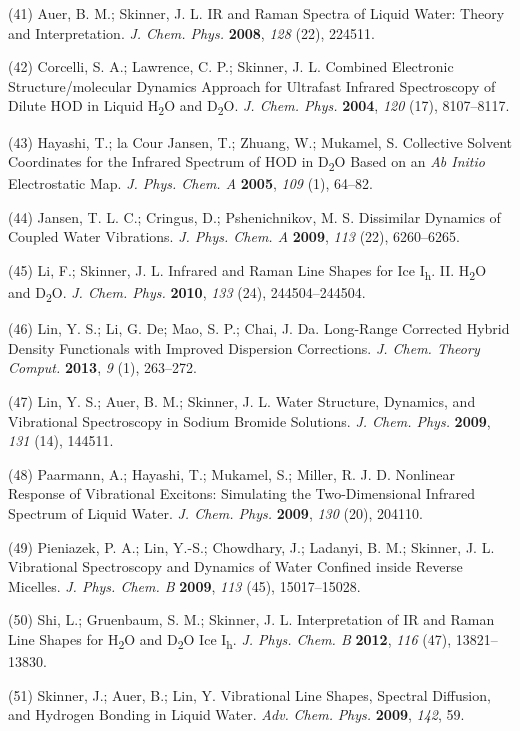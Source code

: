 \documentclass[]{article}
\begin{document}
(41) Auer, B. M.; Skinner, J. L. IR and Raman Spectra of Liquid Water:
Theory and Interpretation. \emph{J. Chem. Phys.} \textbf{2008},
\emph{128} (22), 224511.

(42) Corcelli, S. A.; Lawrence, C. P.; Skinner, J. L. Combined
Electronic Structure/molecular Dynamics Approach for Ultrafast Infrared
Spectroscopy of Dilute HOD in Liquid H\textsubscript{2}O and
D\textsubscript{2}O. \emph{J. Chem. Phys.} \textbf{2004}, \emph{120}
(17), 8107--8117.

(43) Hayashi, T.; la Cour Jansen, T.; Zhuang, W.; Mukamel, S. Collective
Solvent Coordinates for the Infrared Spectrum of HOD in
D\textsubscript{2}O Based on an \emph{Ab Initio} Electrostatic Map.
\emph{J. Phys. Chem. A} \textbf{2005}, \emph{109} (1), 64--82.

(44) Jansen, T. L. C.; Cringus, D.; Pshenichnikov, M. S. Dissimilar
Dynamics of Coupled Water Vibrations. \emph{J. Phys. Chem. A}
\textbf{2009}, \emph{113} (22), 6260--6265.

(45) Li, F.; Skinner, J. L. Infrared and Raman Line Shapes for Ice
I\textsubscript{h}. II. H\textsubscript{2}O and D\textsubscript{2}O.
\emph{J. Chem. Phys.} \textbf{2010}, \emph{133} (24), 244504--244504.

(46) Lin, Y. S.; Li, G. De; Mao, S. P.; Chai, J. Da. Long-Range
Corrected Hybrid Density Functionals with Improved Dispersion
Corrections. \emph{J. Chem. Theory Comput.} \textbf{2013}, \emph{9} (1),
263--272.

(47) Lin, Y. S.; Auer, B. M.; Skinner, J. L. Water Structure, Dynamics,
and Vibrational Spectroscopy in Sodium Bromide Solutions. \emph{J. Chem.
Phys.} \textbf{2009}, \emph{131} (14), 144511.

(48) Paarmann, A.; Hayashi, T.; Mukamel, S.; Miller, R. J. D. Nonlinear
Response of Vibrational Excitons: Simulating the Two-Dimensional
Infrared Spectrum of Liquid Water. \emph{J. Chem. Phys.} \textbf{2009},
\emph{130} (20), 204110.

(49) Pieniazek, P. A.; Lin, Y.-S.; Chowdhary, J.; Ladanyi, B. M.;
Skinner, J. L. Vibrational Spectroscopy and Dynamics of Water Confined
inside Reverse Micelles. \emph{J. Phys. Chem. B} \textbf{2009},
\emph{113} (45), 15017--15028.

(50) Shi, L.; Gruenbaum, S. M.; Skinner, J. L. Interpretation of IR and
Raman Line Shapes for H\textsubscript{2}O and D\textsubscript{2}O Ice
I\textsubscript{h}. \emph{J. Phys. Chem. B} \textbf{2012}, \emph{116}
(47), 13821--13830.

(51) Skinner, J.; Auer, B.; Lin, Y. Vibrational Line Shapes, Spectral
Diffusion, and Hydrogen Bonding in Liquid Water. \emph{Adv.}
\emph{Chem.} \emph{Phys.} \textbf{2009}, \emph{142}, 59.
\end{document}
